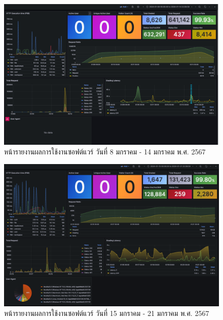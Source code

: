 \documentclass[12pt,one side,openright,a4paper]{cpe-thesis-th}
\begin{document}
\pagebreak


\begin{figure}[H]
  \centering
  \includegraphics[width=15cm]{figure/results/grafana/grafana-jan08-jan14.png}
  \caption[หน้ารายงานผลการใช้งานซอฟต์แวร์ วันที่ 8 มกราคม - 14 มกราคม พ.ศ. 2567]{หน้ารายงานผลการใช้งานซอฟต์แวร์ วันที่ 8 มกราคม - 14 มกราคม พ.ศ. 2567}
  \label{fig:res-grafana-j08j14}
\end{figure}

\begin{figure}[H]
  \centering
  \includegraphics[width=15cm]{figure/results/grafana/grafana-jan15-jan21.png}
  \caption[หน้ารายงานผลการใช้งานซอฟต์แวร์ วันที่ 15 มกราคม - 21 มกราคม พ.ศ. 2567]{หน้ารายงานผลการใช้งานซอฟต์แวร์ วันที่ 15 มกราคม - 21 มกราคม พ.ศ. 2567}
  \label{fig:res-grafana-j15j21}
\end{figure}
\end{document}
